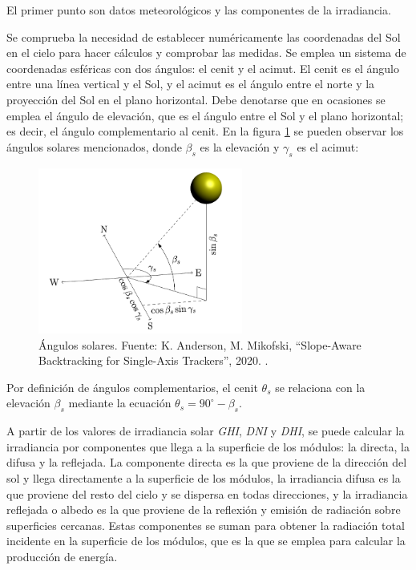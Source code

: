 El primer punto son datos meteorológicos y las componentes de la irradiancia.

Se comprueba la necesidad de establecer numéricamente las coordenadas del Sol en el cielo para hacer cálculos y comprobar las medidas. Se emplea un sistema de \gls{coordenadas esféricas} con dos ángulos: el \gls{cenit} y el \gls{acimut}. El cenit es el ángulo entre una línea vertical y el Sol, y el acimut es el ángulo entre el norte y la proyección del Sol en el plano horizontal. Debe denotarse que en ocasiones se emplea el \gls{ángulo de elevación}, que es el ángulo entre el Sol y el plano horizontal; es decir, el ángulo complementario al cenit. En la figura \ref{fig:solar_angles} se pueden observar los ángulos solares mencionados, donde $\beta_s$ es la elevación y $\gamma_s$ es el acimut:

\begin{figure}[h]
      \centering
      \includegraphics[width=0.6\textwidth]{./images/SoA_irrad/Anderson_Mikofski_Fig2.png}
      \caption{Ángulos solares. Fuente: K. Anderson, M. Mikofski, ``Slope-Aware Backtracking for Single-Axis Trackers'', 2020. \cite[Fig. 2]{Anderson_Mikofski_2020}.}
      \label{fig:solar_angles}
\end{figure}

Por definición de \gls{ángulos complementarios}, el \gls{cenit} $\theta_s$ se relaciona con la elevación $\beta_s$ mediante la ecuación $\theta_s = 90^\circ - \beta_s$.

A partir de los valores de irradiancia solar \textit{\gls{GHI}}, \textit{\gls{DNI}} y \textit{\gls{DHI}}, se puede calcular la irradiancia por componentes que llega a la superficie de los módulos: la \gls{directa}, la \gls{difusa} y la \gls{reflejada}. La componente directa es la que proviene de la dirección del sol y llega directamente a la superficie de los módulos, la irradiancia difusa es la que proviene del resto del cielo y se dispersa en todas direcciones, y la irradiancia reflejada o \gls{albedo} es la que proviene de la reflexión y emisión de radiación sobre superficies cercanas. Estas componentes se suman para obtener la radiación total incidente en la superficie de los módulos, que es la que se emplea para calcular la producción de energía.


